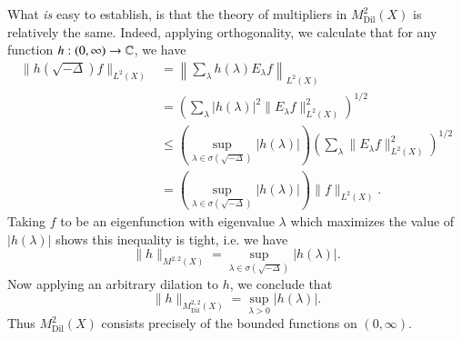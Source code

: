 What \emph{is} easy to establish, is that the theory of multipliers in $M^2_{\text{Dil}}(X)$ is relatively the same. Indeed, applying orthogonality, we calculate that for any function $h: (0,\infty) \to \operatorname{\mathbb{C}}$, we have
%
\begin{align*}
    \| h(\sqrt{-\Delta}) f \|_{L^2(X)} &= \left\| \sum_\lambda h(\lambda) E_\lambda f \right\|_{L^2(X)}\\
    &= \left( \sum_\lambda |h(\lambda)|^2 \| E_\lambda f \|_{L^2(X)}^2 \right)^{1/2}\\
    &\leq \left( \sup_{\lambda \in \sigma(\sqrt{-\Delta})} |h(\lambda)| \right) \left( \sum_\lambda \| E_\lambda f \|_{L^2(X)}^2 \right)^{1/2}\\
    &= \left( \sup_{\lambda \in \sigma(\sqrt{-\Delta})} |h(\lambda)| \right) \| f \|_{L^2(X)}.
\end{align*}
%
Taking $f$ to be an eigenfunction with eigenvalue $\lambda$ which maximizes the value of $|h(\lambda)|$ shows this inequality is tight, i.e. we have
%
\[ \| h \|_{M^{2,2}(X)} = \sup_{\lambda \in \sigma(\sqrt{-\Delta})} |h(\lambda)|. \]
%
Now applying an arbitrary dilation to $h$, we conclude that
%
\[ \| h \|_{M^{2,2}_{\text{Dil}} (X)} = \sup_{\lambda > 0} |h(\lambda)|. \]
%
Thus $M^2_{\text{Dil}}(X)$ consists precisely of the bounded functions on $(0,\infty)$.

